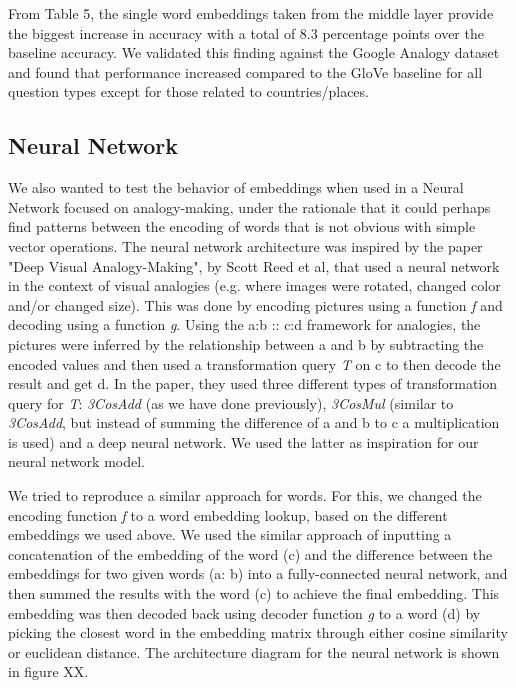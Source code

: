 \documentclass[11pt]{article}
\begin{document}
From Table 5, the single word embeddings taken from the middle layer provide the
biggest increase in accuracy with a total of 8.3 percentage points over the
baseline accuracy. We validated this finding against the Google Analogy dataset
and found that performance increased compared to the GloVe baseline for all
question types except for those related to countries/places.

\subsection{Neural Network}

We also wanted to test the behavior of embeddings when used in a Neural
Network focused on analogy-making, under the rationale that it could
perhaps find patterns between the encoding of words that is not obvious
with simple vector operations. The neural network architecture was
inspired by the paper "Deep Visual Analogy-Making", by Scott Reed et al,
that used a neural network in the context of visual analogies (e.g.
where images were rotated, changed color and/or changed size). This was
done by encoding pictures using a function \emph{f} and decoding using a
function \emph{g}. Using the a:b :: c:d framework for analogies, the
pictures were inferred by the relationship between a and b by
subtracting the encoded values and then used a transformation query
\emph{T} on c to then decode the result and get d. In the paper, they
used three different types of transformation query for \emph{T}:
\emph{3CosAdd} (as we have done previously), \emph{3CosMul} (similar to
\emph{3CosAdd}, but instead of summing the difference of a and b to c a
multiplication is used) and a deep neural network. We used the latter as
inspiration for our neural network model.

We tried to reproduce a similar approach for words. For this, we changed
the encoding function \emph{f} to a word embedding lookup, based on the
different embeddings we used above. We used the similar approach of
inputting a concatenation of the embedding of the word (c) and the
difference between the embeddings for two given words (a: b) into a
fully-connected neural network, and then summed the results with the
word (c) to achieve the final embedding. This embedding was then decoded
back using decoder function \emph{g }to a word (d) by picking the
closest word in the embedding matrix through either cosine similarity or
euclidean distance. The architecture diagram for the neural network is
shown in figure XX.
\end{document}
